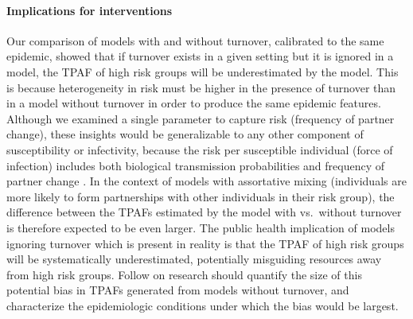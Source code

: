 \paragraph{Implications for interventions}
Our comparison of models with and without turnover,
calibrated to the same epidemic,
showed that if turnover exists in a given setting
but it is ignored in a model,
the TPAF of high risk groups will be underestimated by the model.
This is because heterogeneity in risk
must be higher in the presence of turnover than in a model without turnover
in order to produce the same epidemic features.
Although we examined a single parameter to capture risk (frequency of partner change),
these insights would be generalizable to
any other component of susceptibility or infectivity,
because the risk per susceptible individual (force of infection) includes both
biological transmission probabilities and frequency of partner change \citep{Anderson1991}.
In the context of models with assortative mixing
(individuals are more likely to form partnerships with
other individuals in their risk group),
the difference between the TPAFs estimated by the model
with vs.\ without turnover is therefore expected to be even larger.
The public health implication of models ignoring turnover
which is present in reality is that
the TPAF of high risk groups will be systematically underestimated,
potentially misguiding resources away from high risk groups.
Follow on research should quantify the size of
this potential bias in TPAFs generated from models without turnover,
and characterize the epidemiologic conditions under which the bias would be largest.
